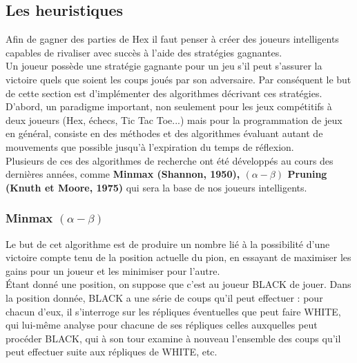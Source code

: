 \documentclass[a4paper,10pt]{article}
\begin{document}
\subsection{Les heuristiques}
Afin de gagner des parties de Hex il faut penser à créer des joueurs intelligents capables de rivaliser avec succès à l'aide des stratégies gagnantes.\\
Un joueur possède une stratégie gagnante pour un jeu s'il peut s'assurer la victoire quels que soient les coups joués par son adversaire. Par conséquent le but de cette section est d'implémenter des algorithmes décrivant ces stratégies.\\

D'abord, un paradigme important, non seulement pour les jeux compétitifs à deux joueurs (Hex, échecs, Tic Tac Toe...) mais pour la programmation de jeux en général, consiste en des méthodes et des algorithmes évaluant autant de mouvements que possible jusqu'à l'expiration du temps de réflexion.\\

Plusieurs de ces des algorithmes de recherche ont été développés au cours des dernières années, comme \textbf{Minmax (Shannon, 1950), $(\alpha -\beta)$ Pruning (Knuth et Moore, 1975)} qui sera la base de nos joueurs intelligents.\\
\subsubsection{Minmax $(\alpha-\beta)$} \label{minmax}
Le but de cet algorithme est de produire un nombre lié à la possibilité d'une victoire compte tenu de la position actuelle du pion, en essayant de maximiser les gains pour un joueur et les minimiser pour l'autre.\\
Étant donné une position, on suppose que c’est au joueur BLACK de jouer. Dans la position donnée, BLACK a une série de coups qu’il peut effectuer : pour chacun d’eux, il s’interroge sur les répliques éventuelles que peut faire WHITE, qui lui-même analyse pour chacune de ses répliques celles auxquelles peut procéder BLACK, qui à son tour examine à nouveau l’ensemble des coups qu’il peut effectuer suite aux répliques de WHITE, etc.\\
\end{document}
